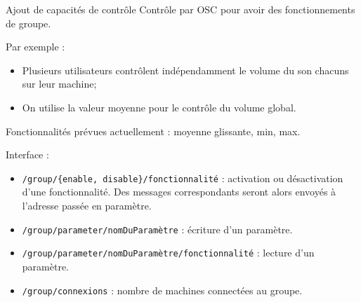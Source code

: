 \begin{frame}{Ajout de capacités de contrôle}
	Contrôle par \textsc{OSC} pour avoir des fonctionnements de groupe.
	
	Par exemple : 
	\begin{itemize}
		\item Plusieurs utilisateurs contrôlent indépendamment le volume du son chacuns sur leur machine;
		\item On utilise la valeur moyenne pour le contrôle du volume global.
	\end{itemize}
		
	Fonctionnalités prévues actuellement : moyenne glissante, min, max.
	
\end{frame}

\begin{frame}
	Interface : 
	
	\begin{itemize}
		\item \texttt{/group/\{enable, disable\}/fonctionnalité} : activation ou désactivation d'une fonctionnalité. Des messages correspondants seront alors envoyés à l'adresse passée en paramètre.
		\item \texttt{/group/parameter/nomDuParamètre} : écriture d'un paramètre.
		\item \texttt{/group/parameter/nomDuParamètre/fonctionnalité} : lecture d'un paramètre.
		\item \texttt{/group/connexions} : nombre de machines connectées au groupe.
	\end{itemize}
\end{frame}

